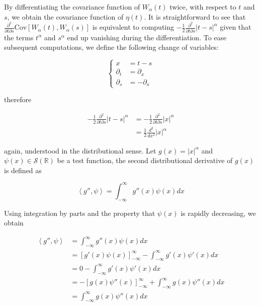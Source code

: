 \noindent By differentiating the covariance function of $W_\alpha(t)$ twice, with respect to $t$ and $s$, we obtain the covariance function of $\eta(t)$. It is straightforward to see that $\frac{\partial^2}{\partial t\partial s}\text{Cov}\left[W_\alpha(t),W_\alpha(s)\right]$ is equivalent to computing $-\frac{1}{2}\frac{\partial^2}{\partial t\partial s}|t-s|^\alpha$ given that the terms $t^\alpha$ and $s^\alpha$ end up vanishing during the differentiation. To ease subsequent computations, we define the following change of variables:

$$
\begin{cases}
    x &= t - s\\
    \partial_t &= \partial_x\\
    \partial_s &= -\partial_x
\end{cases}
$$

therefore

\begin{align*}
    -\frac{1}{2}\frac{\partial^2}{\partial t\partial s}|t-s|^\alpha &= -\frac{1}{2}\frac{\partial^2}{\partial t\partial s}|x|^\alpha\\
    &= \frac{1}{2}\frac{d^2}{dx^2}|x|^\alpha
\end{align*}

\noindent again, understood in the distributional sense. Let $g(x) = |x|^\alpha$ and $\psi(x)\in\mathcal{S}(\mathbb{R})$ be a test function, the second distributional derivative of $g(x)$ is defined as

\begin{equation}
    \left\langle g'',\psi\right\rangle = \int_{-\infty}^{\infty}g''(x)\psi(x)dx\label{eq:distributional_derivative_definition}
\end{equation}

Using integration by parts and the property that $\psi(x)$ is rapidly decreasing, we obtain

\begin{align}
    \left\langle g'',\psi\right\rangle &= \int_{-\infty}^{\infty}g''(x)\psi(x)dx\nonumber\\
    &= \left[g'(x)\psi(x)\right]_{-\infty}^{\infty} - \int_{-\infty}^{\infty}g'(x)\psi'(x)dx\nonumber\\
    &= 0 - \int_{-\infty}^{\infty}g'(x)\psi'(x)dx\nonumber\\
    &= -\left[g(x)\psi''(x)\right]_{-\infty}^{\infty} + \int_{-\infty}^{\infty}g(x)\psi''(x)dx\nonumber\\
    &= \int_{-\infty}^{\infty}g(x)\psi''(x)dx \label{eq:derivative_transferred}
\end{align}


